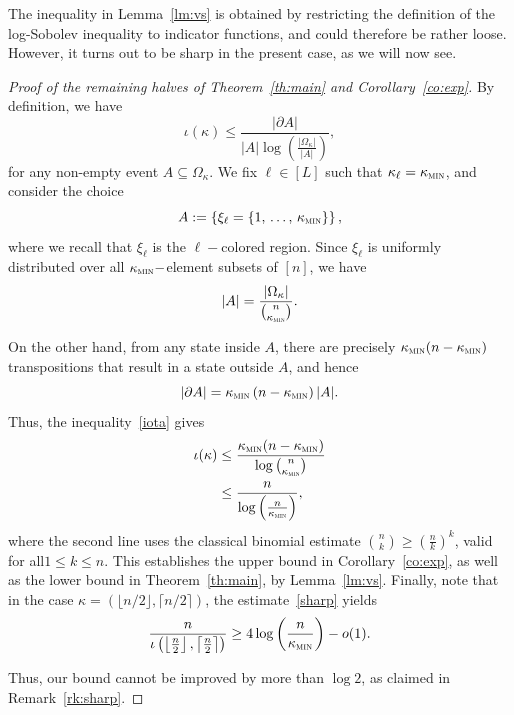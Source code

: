 \documentclass[AHL,Unicode,longabstracts,published]{cedram}
\newcommand{\am}{{\kappa_{\textsc{min}}}}
\begin{document}
The inequality in Lemma~\ref{lm:vs} is obtained by restricting the definition of the log-Sobolev inequality to indicator functions, and could therefore be rather loose. However, it turns out to be sharp in the present case, as we will now see.
\begin{proof}[Proof of the remaining halves of Theorem~\ref{th:main} and Corollary~\ref{co:exp}]By definition, we have
\begin{equation}\label{iota}
\iota(\kappa) \le \frac{|\partial A|}{|A|\log\left(\frac{|\Omega_\kappa|}{|A|}\right)},
\end{equation}
for any non-empty event $A\subseteq \Omega_\kappa$. We fix $\ell\in[L]$ such that $\kappa_\ell=\am$, and consider the choice
\begin{equation}\label{def:A}
A := \left\{\xi_\ell = \{1,\,\ldots,\,\am\} \right\},
\end{equation}
where we recall that $\xi_\ell$ is the $\ell-$colored region. Since $\xi_\ell$ is uniformly distributed over all $\am-$element subsets of $[n]$, we have
\[
|A| = \frac{|\Omega_\kappa|}{\binom{n}{\am}}.
\]

On the other hand, from any state inside $A$, there are precisely $\am(n-\am)$ transpositions that result in a state outside $A$, and hence
\[
|\partial A| = \am\left(n-\am\right)|A|.
\]
Thus, the inequality~\eqref{iota} gives
\begin{align}\label{sharp}
\iota(\kappa) & \le \frac{\am(n-\am)}{\log\binom{n}{\am}}\\
\nonumber & \le \frac{n}{\log{\left(\frac{n}{\am}\right)}},
\end{align}
where the second line uses the classical binomial estimate $\binom{n}{k}\ge (\frac{n}{k})^k$, valid for all\linebreak$1\le k\le n$. This establishes the upper bound in Corollary~\ref{co:exp}, as well as the lower bound in Theorem~\ref{th:main}, by Lemma~\ref{lm:vs}. Finally, note that in the case $\kappa=(\lfloor n/2\rfloor,\lceil n/2\rceil)$, the estimate~\eqref{sharp} yields
\begin{equation}\label{sharpiota}
\frac{n}{\iota\left(\left\lfloor \frac n2\right\rfloor,\left\lceil \frac n2\right\rceil\right)} \ge 4\log\left(\frac{n}{\am}\right)-o(1).
\end{equation}

Thus, our bound cannot be improved by more than $\log 2$, as claimed in Remark~\ref{rk:sharp}.
\end{proof}
\end{document}
